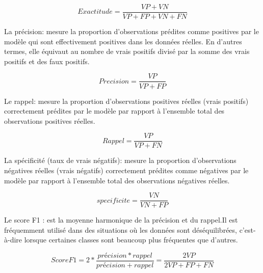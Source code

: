 \begin{outline}
    \begin{equation}
    Exactitude = \frac{VP + VN}{VP + FP + VN + FN}
    \end{equation}

\1 La précision: mesure la proportion d'observations prédites comme positives par le modèle qui sont effectivement positives dans les données réelles. En d'autres termes, elle équivaut au nombre de vrais positifs divisé par la somme des vrais positifs et des faux positifs.

    \begin{equation}
       Precision = \frac{VP}{VP + FP}
    \end{equation}

\1 Le rappel: mesure la proportion d'observations positives réelles (vrais positifs) correctement prédites par le modèle par rapport à l'ensemble total des observations positives réelles.

    \begin{equation}
    Rappel = \frac{VP}{VP + FN}
    \end{equation}
    
\1 La spécificité (taux de vrais négatifs): mesure la proportion d'observations négatives réelles (vrais négatifs) correctement prédites comme négatives par le modèle par rapport à l'ensemble total des observations négatives réelles.

    \begin{equation}
      specificite = \frac{VN}{VN + FP}
    \end{equation}

\1  Le score F1 : est la moyenne harmonique de la précision et du rappel.Il est fréquemment utilisé dans des situations où les données sont déséquilibrées, c'est-à-dire lorsque certaines classes sont beaucoup plus fréquentes que d'autres.

    \begin{equation}
         Score F1 = 2 * \frac{précision* rappel}{précision + rappel} = \frac{2VP}{2VP + FP + FN}
    \end{equation}

\end{outline}

